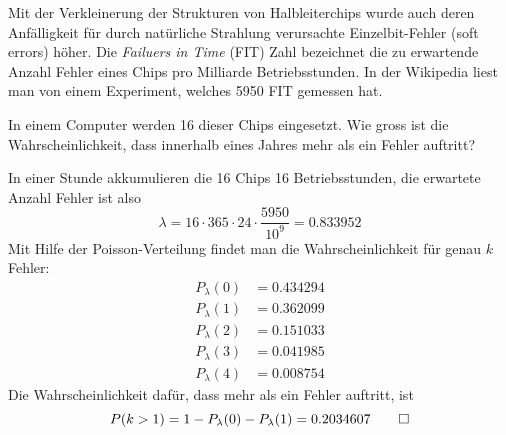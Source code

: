 Mit der Verkleinerung der Strukturen von Halbleiterchips wurde auch deren
Anfälligkeit für durch natürliche Strahlung verursachte Einzelbit-Fehler
(soft errors)
höher.
Die {\em Failuers in Time} (FIT) Zahl bezeichnet die zu erwartende Anzahl
Fehler eines Chips pro Milliarde Betriebsstunden.
In der Wikipedia liest man von einem Experiment, welches 5950 FIT
gemessen hat.

In einem Computer werden 16 dieser Chips eingesetzt.
Wie gross ist die Wahrscheinlichkeit, dass innerhalb eines
Jahres mehr als ein Fehler auftritt?

\begin{loesung}
In einer Stunde akkumulieren die 16 Chips 16 Betriebsstunden, die erwartete
Anzahl Fehler ist also
\[
\lambda = 16\cdot365\cdot 24 \cdot \frac{5950}{10^{9}}=0.833952
\]
Mit Hilfe der Poisson-Verteilung findet man die Wahrscheinlichkeit für
genau $k$ Fehler:
\begin{align*}
P_{\lambda}(0)&=0.434294\\
P_{\lambda}(1)&=0.362099\\
P_{\lambda}(2)&=0.151033\\
P_{\lambda}(3)&=0.041985\\
P_{\lambda}(4)&=0.008754
\end{align*}
Die Wahrscheinlichkeit dafür, dass mehr als ein Fehler auftritt, ist
\[
P(k > 1)=1-P_\lambda(0)-P_\lambda(1)=0.2034607
\qedhere
\]
\end{loesung}


